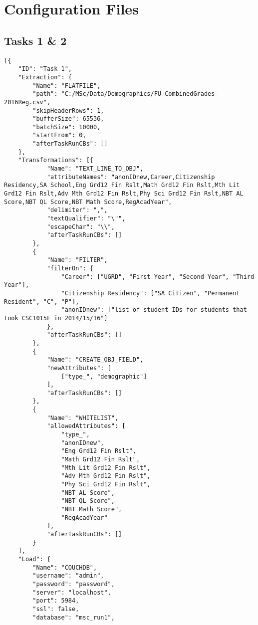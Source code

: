 \section{Configuration Files}
\label{netl-configuration}

\subsection{Tasks 1 \& 2}
\label{netl-tasks-1-2-config}
\begin{verbatim}
[{
    "ID": "Task 1",
    "Extraction": {
        "Name": "FLATFILE",
        "path": "C:/MSc/Data/Demographics/FU-CombinedGrades-2016Reg.csv",
        "skipHeaderRows": 1,
        "bufferSize": 65536,
        "batchSize": 10000,
        "startFrom": 0,
        "afterTaskRunCBs": []
    },
    "Transformations": [{
            "Name": "TEXT_LINE_TO_OBJ",
            "attributeNames": "anonIDnew,Career,Citizenship Residency,SA School,Eng Grd12 Fin Rslt,Math Grd12 Fin Rslt,Mth Lit Grd12 Fin Rslt,Adv Mth Grd12 Fin Rslt,Phy Sci Grd12 Fin Rslt,NBT AL Score,NBT QL Score,NBT Math Score,RegAcadYear",
            "delimiter": ",",
            "textQualifier": "\"",
            "escapeChar": "\\",
            "afterTaskRunCBs": []
        },
        {
            "Name": "FILTER",
            "filterOn": {
                "Career": ["UGRD", "First Year", "Second Year", "Third Year"],
                "Citizenship Residency": ["SA Citizen", "Permanent Resident", "C", "P"],
                "anonIDnew": ["list of student IDs for students that took CSC1015F in 2014/15/16"]
            },
            "afterTaskRunCBs": []
        },
        {
            "Name": "CREATE_OBJ_FIELD",
            "newAttributes": [
                ["type_", "demographic"]
            ],
            "afterTaskRunCBs": []
        },
        {
            "Name": "WHITELIST",
            "allowedAttributes": [
                "type_",
                "anonIDnew",
                "Eng Grd12 Fin Rslt",
                "Math Grd12 Fin Rslt",
                "Mth Lit Grd12 Fin Rslt",
                "Adv Mth Grd12 Fin Rslt",
                "Phy Sci Grd12 Fin Rslt",
                "NBT AL Score",
                "NBT QL Score",
                "NBT Math Score",
                "RegAcadYear"
            ],
            "afterTaskRunCBs": []
        }
    ],
    "Load": {
        "Name": "COUCHDB",
        "username": "admin",
        "password": "password",
        "server": "localhost",
        "port": 5984,
        "ssl": false,
        "database": "msc_run1",

\end{verbatim}
